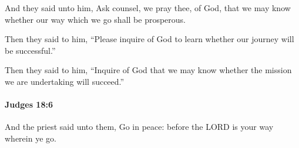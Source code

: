 			\begin{versebox}
					\item[BHS] 
					\item[ASV] And they said unto him, Ask counsel, we pray thee, of God, that we may know whether our way which we go shall be prosperous.
					\item[NIV] Then they said to him, “Please inquire of God to learn whether our journey will be successful.”
					\item[NRSV] Then they said to him, “Inquire of God that we may know whether the mission we are undertaking will succeed.”
			\end{versebox}

		\paragraph{Judges 18:6} %
			\label{JUDGES-18-6}

			And the priest said unto them, Go in peace: before the LORD is your way wherein ye go.

